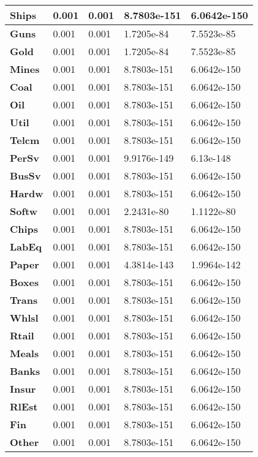 \begin{tabular}{|l|l|l|l|l|}
\textbf{Ships}&0.001&0.001&8.7803e-151&6.0642e-150\\\hline
\textbf{Guns}&0.001&0.001&1.7205e-84&7.5523e-85\\\hline
\textbf{Gold}&0.001&0.001&1.7205e-84&7.5523e-85\\\hline
\textbf{Mines}&0.001&0.001&8.7803e-151&6.0642e-150\\\hline
\textbf{Coal}&0.001&0.001&8.7803e-151&6.0642e-150\\\hline
\textbf{Oil}&0.001&0.001&8.7803e-151&6.0642e-150\\\hline
\textbf{Util}&0.001&0.001&8.7803e-151&6.0642e-150\\\hline
\textbf{Telcm}&0.001&0.001&8.7803e-151&6.0642e-150\\\hline
\textbf{PerSv}&0.001&0.001&9.9176e-149&6.13e-148\\\hline
\textbf{BusSv}&0.001&0.001&8.7803e-151&6.0642e-150\\\hline
\textbf{Hardw}&0.001&0.001&8.7803e-151&6.0642e-150\\\hline
\textbf{Softw}&0.001&0.001&2.2431e-80&1.1122e-80\\\hline
\textbf{Chips}&0.001&0.001&8.7803e-151&6.0642e-150\\\hline
\textbf{LabEq}&0.001&0.001&8.7803e-151&6.0642e-150\\\hline
\textbf{Paper}&0.001&0.001&4.3814e-143&1.9964e-142\\\hline
\textbf{Boxes}&0.001&0.001&8.7803e-151&6.0642e-150\\\hline
\textbf{Trans}&0.001&0.001&8.7803e-151&6.0642e-150\\\hline
\textbf{Whlsl}&0.001&0.001&8.7803e-151&6.0642e-150\\\hline
\textbf{Rtail}&0.001&0.001&8.7803e-151&6.0642e-150\\\hline
\textbf{Meals}&0.001&0.001&8.7803e-151&6.0642e-150\\\hline
\textbf{Banks}&0.001&0.001&8.7803e-151&6.0642e-150\\\hline
\textbf{Insur}&0.001&0.001&8.7803e-151&6.0642e-150\\\hline
\textbf{RlEst}&0.001&0.001&8.7803e-151&6.0642e-150\\\hline
\textbf{Fin}&0.001&0.001&8.7803e-151&6.0642e-150\\\hline
\textbf{Other}&0.001&0.001&8.7803e-151&6.0642e-150\\\hline
\end{tabular}
